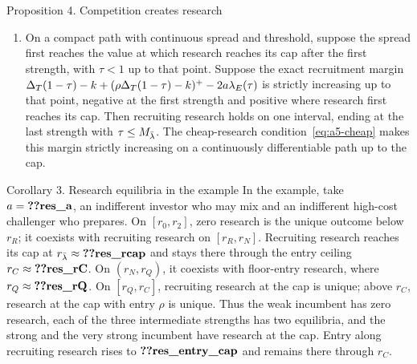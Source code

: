 \begin{named}{Proposition 4. Competition creates research}
\begin{enumerate}[label=(\alph*),leftmargin=2em]
(Lemma~\ref{lem:decisive}).
\item On a compact path with continuous spread and threshold, suppose the spread first reaches the value
at which research reaches its cap after the first strength, with \(\tau<1\) up to that point. Suppose the exact
recruitment margin
\(\Delta_T(1-\tau)-k+(\rho\Delta_T(1-\tau)-k)^+-2a\lambda_E(\tau)\)
is strictly increasing up to that point, negative at the first strength and positive where research first reaches its cap.
Then recruiting research holds on one interval, ending at the last strength with \(\tau\le M_{\bar\lambda}\).
The cheap-research condition~\eqref{eq:a5-cheap} makes this margin strictly increasing on a continuously
differentiable path up to the cap.
\end{enumerate}
\end{named}

\begin{named}{Corollary 3. Research equilibria in the example}
In the example, take \(a=\reg{res_a}\), an indifferent investor who may mix and an
indifferent high-cost challenger who prepares. On \([r_0,r_2]\), zero research is the unique outcome below
\(r_R\); it coexists with recruiting research on \([r_R,r_N]\). Recruiting research reaches its cap at
\(r_{\lb}\approx\reg{res_rcap}\) and stays there through the entry ceiling \(r_C\approx\reg{res_rC}\).
On \((r_N,r_Q)\), it coexists with floor-entry research, where \(r_Q\approx\reg{res_rQ}\). On \([r_Q,r_C]\),
recruiting research at the cap is unique; above \(r_C\), research at the cap with entry \(\rho\) is unique.
Thus the weak incumbent has zero research, each of the three intermediate strengths has two equilibria,
and the strong and the very strong incumbent have research at the cap. Entry along recruiting research rises to
\(\reg{res_entry_cap}\) and remains there through \(r_C\).
\end{named}

